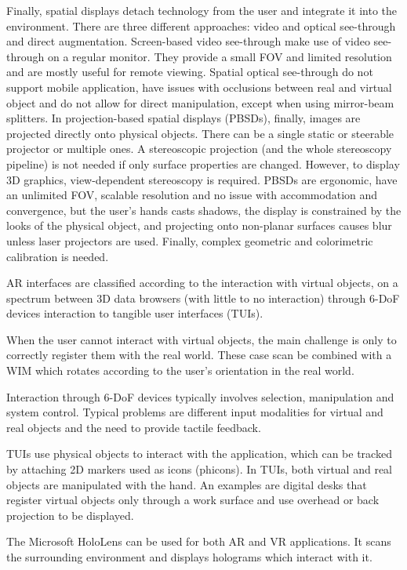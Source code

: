 \documentclass[a4paper]{article}
\begin{document}
Finally, spatial displays detach technology from the user and integrate it into the environment.
There are three different approaches: video and optical see-through and direct augmentation.
Screen-based video see-through make use of video see-through on a regular monitor. They provide a small FOV and limited resolution and are mostly useful for remote viewing. Spatial optical see-through do not support mobile application, have issues with occlusions between real and virtual object and do not allow for direct manipulation, except when using mirror-beam splitters.
In projection-based spatial displays (PBSDs), finally, images are projected directly onto physical objects. There can be a single static or steerable projector or multiple ones.
A stereoscopic projection (and the whole stereoscopy pipeline) is not needed if only surface properties are changed. However, to display 3D graphics, view-dependent stereoscopy is required.
PBSDs are ergonomic, have an unlimited FOV, scalable resolution and no issue with accommodation and convergence, but the user's hands casts shadows, the display is constrained by the looks of the physical object, and projecting onto non-planar surfaces causes blur unless laser projectors are used. Finally, complex geometric and colorimetric calibration is needed.

AR interfaces are classified according to the interaction with virtual objects, on a spectrum between 3D data browsers (with little to no interaction) through 6-DoF devices interaction to tangible user interfaces (TUIs).

When the user cannot interact with virtual objects, the main challenge is only to correctly register them with the real world.
These case scan be combined with a WIM which rotates according to the user's orientation in the real world.

Interaction through 6-DoF devices typically involves selection, manipulation and system control. Typical problems are different input modalities for virtual and real objects and the need to provide tactile feedback.

TUIs use physical objects to interact with the application, which can be tracked by attaching 2D markers used as icons (phicons). In TUIs, both virtual and real objects are manipulated with the hand. An examples are digital desks that register virtual objects only through a work surface and use overhead or back projection to be displayed.

The Microsoft HoloLens can be used for both AR and VR applications. It scans the surrounding environment and displays holograms which interact with it.
\end{document}
